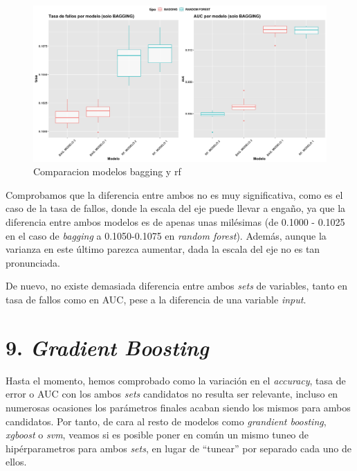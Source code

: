 \documentclass[
]{article}
\begin{document}
\begin{figure}[h!]

{\centering \includegraphics[width=0.99\linewidth,height=0.99\textheight,]{./charts/random_forest/comparacion_bagging_rf} 

}

\caption{Comparacion modelos bagging y rf}\label{fig:unnamed-chunk-105}
\end{figure}

Comprobamos que la diferencia entre ambos no es muy significativa, como
es el caso de la tasa de fallos, donde la escala del eje puede llevar a
engaño, ya que la diferencia entre ambos modelos es de apenas unas
milésimas (de 0.1000 - 0.1025 en el caso de \emph{bagging} a
0.1050-0.1075 en \emph{random forest}). Además, aunque la varianza en
este último parezca aumentar, dada la escala del eje no es tan
pronunciada.

De nuevo, no existe demasiada diferencia entre ambos \emph{sets} de
variables, tanto en tasa de fallos como en AUC, pese a la diferencia de
una variable \emph{input}.

\hypertarget{gradient-boosting}{%
\section{\texorpdfstring{9. \emph{Gradient
Boosting}}{9. Gradient Boosting}}\label{gradient-boosting}}

Hasta el momento, hemos comprobado como la variación en el
\emph{accuracy}, tasa de error o AUC con los ambos \emph{sets}
candidatos no resulta ser relevante, incluso en numerosas ocasiones los
parámetros finales acaban siendo los mismos para ambos candidatos. Por
tanto, de cara al resto de modelos como \emph{grandient boosting},
\emph{xgboost} o \emph{svm}, veamos si es posible poner en común un
mismo tuneo de hipérparametros para ambos \emph{sets}, en lugar de
``tunear'' por separado cada uno de ellos.
\end{document}

